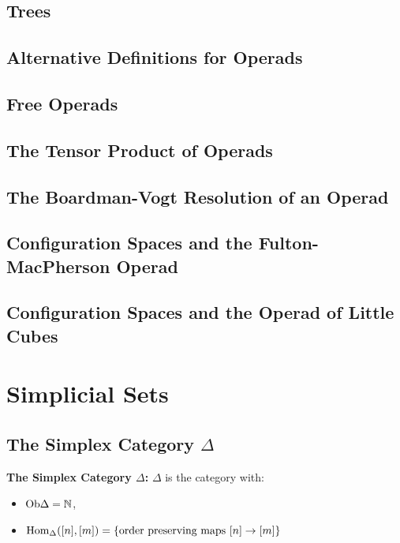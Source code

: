 \subsection{Trees}

\subsection{Alternative Definitions for Operads}

\subsection{Free Operads}

\subsection{The Tensor Product of Operads}

\subsection{The Boardman-Vogt Resolution of an Operad}

\subsection{Configuration Spaces and the Fulton-MacPherson Operad}

\subsection{Configuration Spaces and the Operad of Little Cubes}

\section{Simplicial Sets}
\subsection{The Simplex Category $\Delta$}
\begin{definition}
    \textbf{The Simplex Category $\Delta$: }$\Delta$ is the category with:
    \begin{itemize}
        \item $\text{Ob}\Delta = \mathbb{N}$,
        \item $\text{Hom}_{\Delta}([n], [m]) = \{\text{order preserving maps } [n]\to [m]\}$
    \end{itemize}
\end{definition}

